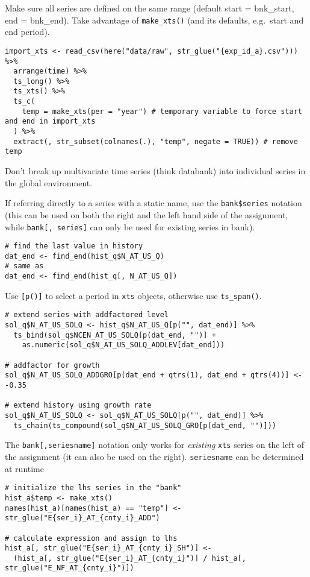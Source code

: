 \documentclass[
  letterpaper,
  DIV=11,
  numbers=noendperiod]{scrreport}
\begin{document}
Make sure all series are defined on the same range (default start =
bnk\_start, end = bnk\_end). Take advantage of \texttt{make\_xts()} (and
its defaults, e.g.~start and end period).

\begin{verbatim}
import_xts <- read_csv(here("data/raw", str_glue("{exp_id_a}.csv"))) %>%
  arrange(time) %>%
  ts_long() %>%
  ts_xts() %>%
  ts_c(
    temp = make_xts(per = "year") # temporary variable to force start and end in import_xts
  ) %>%
  extract(, str_subset(colnames(.), "temp", negate = TRUE)) # remove temp
\end{verbatim}

Don't break up multivariate time series (think databank) into individual
series in the global environment.

If referring directly to a series with a static name, use the
\texttt{bank\$series} notation (this can be used on both the right and
the left hand side of the assignment, while \texttt{bank{[},\ series{]}}
can only be used for existing series in bank).

\begin{verbatim}
# find the last value in history
dat_end <- find_end(hist_q$N_AT_US_Q)
# same as
dat_end <- find_end(hist_q[, N_AT_US_Q])
\end{verbatim}

Use \texttt{{[}p(){]}} to select a period in \texttt{xts} objects,
otherwise use \texttt{ts\_span()}.

\begin{verbatim}
# extend series with addfactored level
sol_q$N_AT_US_SOLQ <- hist_q$N_AT_US_Q[p("", dat_end)] %>%
  ts_bind(sol_q$NCEN_AT_US_SOLQ[p(dat_end, "")] +
    as.numeric(sol_q$N_AT_US_SOLQ_ADDLEV[dat_end]))
    
# addfactor for growth
sol_q$N_AT_US_SOLQ_ADDGRO[p(dat_end + qtrs(1), dat_end + qtrs(4))] <- -0.35

# extend history using growth rate
sol_q$N_AT_US_SOLQ <- sol_q$N_AT_US_SOLQ[p("", dat_end)] %>%
  ts_chain(ts_compound(sol_q$N_AT_US_SOLQ_GRO[p(dat_end, "")]))
\end{verbatim}

The \texttt{bank{[},seriesname{]}} notation only works for
\emph{existing} \texttt{xts} series on the left of the assignment (it
can also be used on the right). \texttt{seriesname} can be determined at
runtime

\begin{verbatim}
# initialize the lhs series in the "bank"
hist_a$temp <- make_xts()
names(hist_a)[names(hist_a) == "temp"] <- str_glue("E{ser_i}_AT_{cnty_i}_ADD")

# calculate expression and assign to lhs
hist_a[, str_glue("E{ser_i}_AT_{cnty_i}_SH")] <- 
  (hist_a[, str_glue("E{ser_i}_AT_{cnty_i}")] / hist_a[, str_glue("E_NF_AT_{cnty_i}")])
\end{verbatim}
\end{document}

